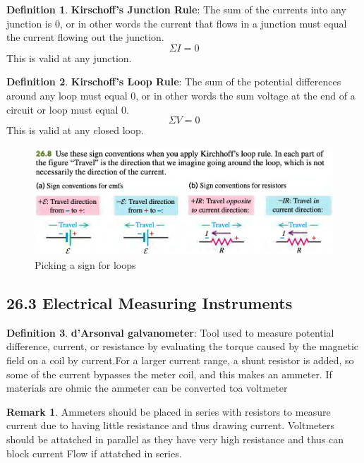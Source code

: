\documentclass[12pt]{amsart}
\theoremstyle{definition}
\newtheorem{definition}{Definition} %
\newtheorem*{remark}{Remark}        %
\numberwithin{equation}{theorem}    %
\begin{document}
\begin{definition}
    \textbf{Kirschoff's Junction Rule}:
    The sum of the currents into any junction is 0, or in other words the current
    that flows in a junction must equal the current flowing out the junction.
    $$\Sigma I =0$$
    This is valid at any junction.
\end{definition}

\begin{definition}
    \textbf{Kirschoff's Loop Rule}:
    The sum of the potential differences around any loop must equal 0, or in other 
    words the sum voltage at the end of a circuit or loop must equal 0.
    $$\Sigma V =0$$
    This is valid at any closed loop.
\end{definition}

\begin{figure}[H]
    \centering
    \includegraphics[width=5in,scale=0.25]{Media/Loopsign.png}
    \caption{Picking a sign for loops}
    \label{Picking a sign for loops}
\end{figure}

\subsection*{26.3 Electrical Measuring Instruments}

\begin{definition}
    \textbf{d’Arsonval galvanometer}:
    Tool used to measure potential difference, current, or resistance by evaluating
    the torque caused by the magnetic field on a coil by current.For a larger 
    current range, a shunt resistor is added, so some of the current bypasses the meter coil, 
    and this makes an ammeter. If materials are ohmic the ammeter can be converted toa voltmeter
\end{definition}

\begin{remark}
    Ammeters should be placed in series with resistors to measure current due to 
    having little resistance and thus drawing current. Voltmeters should be attatched
    in parallel as they have very high resistance and thus can block current Flow
    if attatched in series.
\end{remark}
\end{document}
